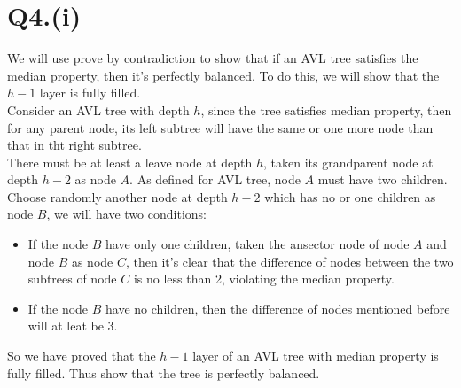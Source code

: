 \documentclass{article}
\begin{document}
\section*{Q4.(i)}
    We will use prove by contradiction to show that if an AVL tree satisfies the median property, then it's
    perfectly balanced. To do this, we will show that the $h-1$ layer is fully filled.\\
    Consider an AVL tree with depth $h$, since the tree satisfies median property, then for any parent node, its left 
    subtree will have the same or one more node than that in tht right subtree.\\
    There must be at least a leave node at depth $h$, taken its grandparent node at depth $h-2$ as node $A$. As defined for AVL tree,
    node $A$ must have two children. Choose randomly another node at depth $h-2$ which has no or one children as node $B$, we will
    have two conditions:
\begin{itemize}
    \item If the node $B$ have only one children, taken the ansector node of node $A$ and node $B$ as node $C$, then it's clear that
          the difference of nodes between the two subtrees of node $C$ is no less than 2, violating the median property.
    \item If the node $B$ have no children, then the difference of nodes mentioned before will at leat be 3.
\end{itemize}
    So we have proved that the $h-1$ layer of an AVL tree with median property is fully filled. Thus show that the tree is perfectly balanced.\\
\end{document}
